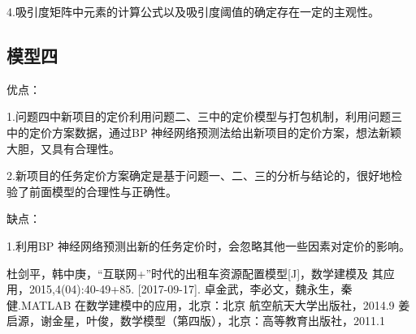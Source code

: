 \documentclass[withoutpreface,bwprint]{cumcmthesis} %
\begin{document}
4.吸引度矩阵中元素的计算公式以及吸引度阈值的确定存在一定的主观性。

\subsection{模型四}

优点：

1.问题四中新项目的定价利用问题二、三中的定价模型与打包机制，利用问题三
中的定价方案数据，通过BP 神经网络预测法给出新项目的定价方案，想法新颖
大胆，又具有合理性。

2.新项目的任务定价方案确定是基于问题一、二、三的分析与结论的，很好地检
验了前面模型的合理性与正确性。

缺点：

1.利用BP 神经网络预测出新的任务定价时，会忽略其他一些因素对定价的影响。

\begin{thebibliography}{9}%
杜剑平，韩中庚，“互联网+”时代的出租车资源配置模型[J]，数学建模及
    其应用，2015,4(04):40-49+85. [2017-09-17].
    卓金武，李必文，魏永生，秦健.MATLAB 在数学建模中的应用，北京：北京
    航空航天大学出版社，2014.9
    姜启源，谢金星，叶俊，数学模型（第四版），北京：高等教育出版社，2011.1
\end{thebibliography}

\begin{appendices}
\end{appendices}
\end{document}

